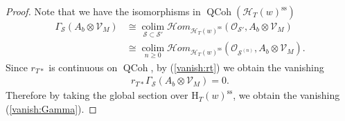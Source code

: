 \documentclass[11pt,oneside,a4paper,mathscr]{amsart}
\theoremstyle{definition}
\renewcommand{\geq}{\geqslant}
\newcommand{\cS}{\mathcal{S}}
\newcommand{\QCoh}{\operatorname{QCoh}}
\newcommand{\cH}{\mathcal{H}}
\newcommand{\cHom}{\mathcal{H}om}
\begin{document}
\begin{proof}
Note that we have the isomorphisms in $\QCoh(\cH_T(w)^{\mathrm{ss}})$
\begin{align*}
\Gamma_{\cS}(A_b\otimes \mathcal{V}_M)&\cong 
\operatorname*{colim}_{\cS \subset \cS'}
    \cHom_{\cH_T(w)^{\mathrm{ss}}}(\mathcal{O}_{\cS'}, A_b \otimes \mathcal{V}_M) \\
    &\cong \operatorname*{colim}_{n\geq 0}\cHom_{\cH_T(w)^{\mathrm{ss}}}(\mathcal{O}_{\cS^{(n)}}, A_b \otimes \mathcal{V}_M).
    \end{align*}
    Since $r_{T*}$ is continuous on $\QCoh$, by (\ref{vanish:rt}) we obtain the vanishing 
    \begin{align*}
        r_{T*}\Gamma_{\cS}(A_b \otimes \mathcal{V}_M)=0.
    \end{align*}
Therefore by taking the global section over $\mathrm{H}_T(w)^{\mathrm{ss}}$, we obtain the vanishing (\ref{vanish:Gamma}). 
\end{proof}
\end{document}
